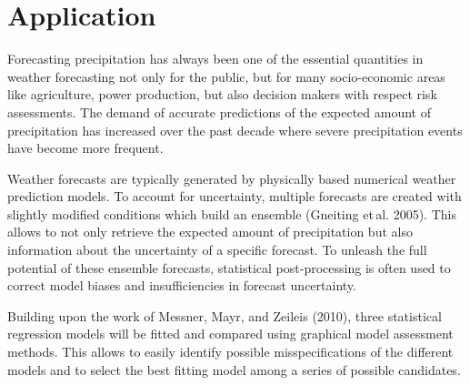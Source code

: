 \documentclass[twoside]{report}
\begin{document}
{    %
}


\maketitle



\section{Application}

Forecasting precipitation has always been one of the essential quantities in
weather forecasting not only for the public, but for many socio-economic areas
like agriculture, power production, but also decision makers with respect risk
assessments. 
The demand of accurate predictions of the expected amount of precipitation has
increased over the past decade where severe precipitation events have
become more frequent.

Weather forecasts are typically generated by physically based numerical weather
prediction models. To account for uncertainty, multiple forecasts are created
with slightly modified conditions which build an ensemble (Gneiting et\,al.
2005). This allows to not only retrieve the expected amount of precipitation
but also information about the uncertainty of a specific forecast.
To unleash the full potential of these ensemble forecasts, statistical
post-processing is often used to correct model biases and insufficiencies in
forecast uncertainty.

Building upon the work of Messner, Mayr, and Zeileis (2010), three statistical
regression models will be fitted and compared using
graphical model assessment methods.
This allows to easily identify possible misspecifications of the different
models and to select the best fitting model among a series of possible candidates.
\end{document}
